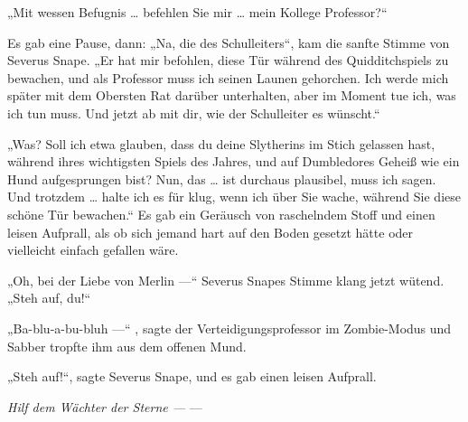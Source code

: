 „Mit wessen Befugnis … befehlen Sie mir … mein Kollege Professor?“

Es gab eine Pause, dann:
„Na, die des Schulleiters“, kam die sanfte Stimme von Severus Snape.
„Er hat mir befohlen, diese Tür während des Quidditchspiels zu bewachen, und als Professor muss ich seinen Launen gehorchen. Ich werde mich später mit dem Obersten Rat darüber unterhalten, aber im Moment tue ich, was ich tun muss. Und jetzt ab mit dir, wie der Schulleiter es wünscht.“

„Was? Soll ich etwa glauben, dass du deine Slytherins im Stich gelassen hast, während ihres wichtigsten Spiels des Jahres, und auf Dumbledores Geheiß wie ein Hund aufgesprungen bist? Nun, das … ist durchaus plausibel, muss ich sagen. Und trotzdem … halte ich es für klug, wenn ich über Sie wache, während Sie diese schöne Tür bewachen.“
Es gab ein Geräusch von raschelndem Stoff und einen leisen Aufprall, als ob sich jemand hart auf den Boden gesetzt hätte oder vielleicht einfach gefallen wäre.

„Oh, bei der Liebe von Merlin —“ Severus Snapes Stimme klang jetzt wütend.
„Steh auf, du!“

„Ba-blu-a-bu-bluh —“ , sagte der Verteidigungsprofessor im Zombie-Modus und Sabber tropfte ihm aus dem offenen Mund.

„Steh auf!“, sagte Severus Snape, und es gab einen leisen Aufprall.

\emph{Hilf dem Wächter der Sterne —} —

